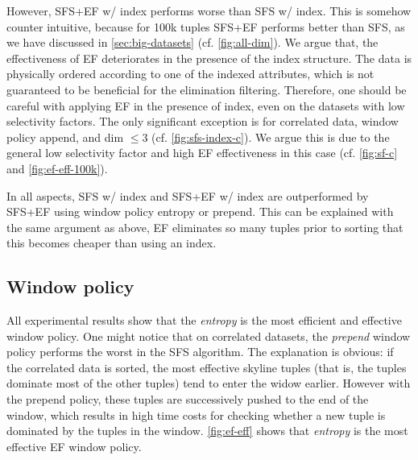 However, SFS+EF w/ index performs worse than SFS w/ index.  This is
somehow counter intuitive, because for 100k tuples SFS+EF performs
better than SFS, as we have discussed in
\autoref{sec:big-datasets} (cf. \autoref{fig:all-dim}).  We
argue that, the effectiveness of EF deteriorates in the presence of
the index structure.  The data is physically ordered according to one
of the indexed attributes, which is not guaranteed to be beneficial
for the elimination filtering.  Therefore, one should be careful with
applying EF in the presence of index, even on the datasets with low
selectivity factors.
%
The only significant exception is for correlated data, window policy
append, and dim $\le 3$ (cf. \autoref{fig:sfs-index-c}).  We argue
this is due to the general low selectivity factor and high EF
effectiveness in this case (cf. \autoref{fig:sf-c} and
\ref{fig:ef-eff-100k}).

In all aspects, SFS w/ index and SFS+EF w/ index are outperformed by
SFS+EF using window policy entropy or prepend. This can be explained
with the same argument as above, EF eliminates so many tuples prior to
sorting that this becomes cheaper than using an index.

\subsection{Window policy}
All experimental results show that the \emph{entropy} is the most
efficient and effective window policy.  One might notice that on
correlated datasets, the \emph{prepend} window policy performs the
worst in the SFS algorithm.  The explanation is obvious: if the
correlated data is sorted, the most effective skyline tuples (that is,
the tuples dominate most of the other tuples) tend to enter the widow
earlier.  However with the prepend policy, these tuples are
successively pushed to the end of the window, which results in high
time costs for checking whether a new tuple is dominated by the tuples
in the window.  \autoref{fig:ef-eff} shows that \emph{entropy} is
the most effective EF window policy.

%
% 



